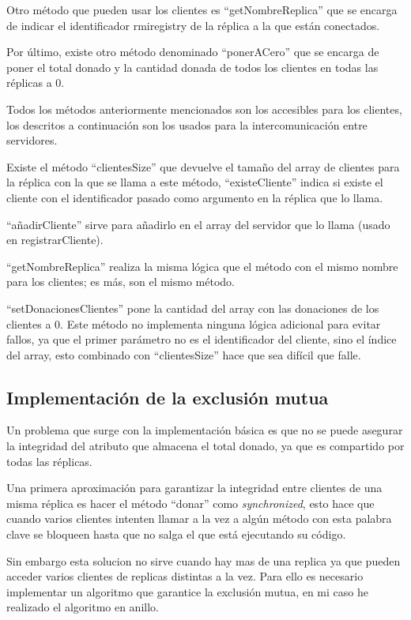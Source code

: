 \documentclass{article}
\begin{document}
Otro método que pueden usar los clientes es ``getNombreReplica'' que se encarga de indicar el identificador rmiregistry de la réplica a la que están conectados.

Por último, existe otro método denominado ``ponerACero'' que se encarga de poner el total donado y la cantidad donada de todos los clientes en todas las réplicas a 0.

Todos los métodos anteriormente mencionados son los accesibles para los clientes, los descritos a continuación son los usados para la intercomunicación entre servidores.

Existe el método ``clientesSize'' que devuelve el tamaño del array de clientes para la réplica con la que se llama a este método, ``existeCliente'' indica si existe el cliente con el identificador pasado como argumento en la réplica que lo llama. 

``añadirCliente'' sirve para añadirlo en el array del servidor que lo llama (usado en registrarCliente).

``getNombreReplica'' realiza la misma lógica que el método con el mismo nombre para los clientes; es más, son el mismo método.

``setDonacionesClientes'' pone la cantidad del array con las donaciones de los clientes a 0. Este método no implementa ninguna lógica adicional para evitar fallos, ya que el primer parámetro no es el identificador del cliente, sino el índice del array, esto combinado con ``clientesSize'' hace que sea difícil que falle.

\subsection{Implementación de la exclusión mutua}
Un problema que surge con la implementación básica es que no se puede asegurar la integridad del atributo que almacena el total donado, ya que es compartido por todas las réplicas. 


Una primera aproximación para garantizar la integridad entre clientes de una misma réplica es hacer el método ``donar'' como \textit{synchronized}, esto hace que cuando varios clientes intenten llamar a la vez a algún método con esta palabra clave se bloqueen hasta que no salga el que está ejecutando su código.

Sin embargo esta solucion no sirve cuando hay mas de una replica ya que pueden acceder varios clientes de replicas distintas a la vez. Para ello es necesario implementar un algoritmo que garantice la exclusión mutua, en mi caso he realizado el algoritmo en anillo.
\end{document}
